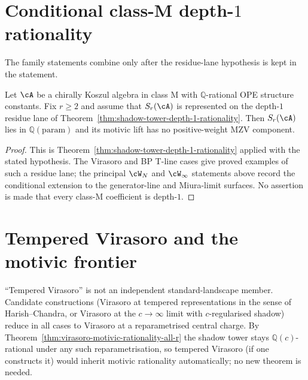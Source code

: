 \section{Conditional class-M depth-$1$ rationality}
\label{sec:class-m-motivic-rationality-full}

The family statements combine only after the residue-lane hypothesis is
kept in the statement.

\begin{theorem}
\ClaimStatusConditional
Let $\cA$ be a chirally Koszul algebra in class M with
$\mathbb{Q}$-rational OPE structure constants. Fix $r \geq 2$ and
assume that $S_r(\cA)$ is represented on the depth-$1$ residue lane of
Theorem~\ref{thm:shadow-tower-depth-1-rationality}. Then
$S_r(\cA)$ lies in $\mathbb{Q}(\mathrm{param})$ and its motivic lift
has no positive-weight MZV component.
\end{theorem}

\begin{proof}
This is Theorem~\ref{thm:shadow-tower-depth-1-rationality} applied
with the stated hypothesis. The Virasoro and BP T-line cases give
proved examples of such a residue lane; the principal $\cW_N$ and
$\cW_\infty$ statements above record the conditional extension to the
generator-line and Miura-limit surfaces. No assertion is made that
every class-M coefficient is depth-$1$.
\end{proof}

\section{Tempered Virasoro and the motivic frontier}
\label{sec:tempered-vir-motivic-frontier}

\begin{remark}
``Tempered Virasoro'' is not an independent standard-landscape
member. Candidate constructions (Virasoro at tempered representations
in the sense of Harish--Chandra, or Virasoro at the $c \to \infty$
limit with $c$-regularised shadow) reduce in all cases to
Virasoro at a reparametrised central charge. By
Theorem~\ref{thm:virasoro-motivic-rationality-all-r} the shadow
tower stays $\mathbb{Q}(c)$-rational under any such
reparametrisation, so tempered Virasoro (if one constructs it) would
inherit motivic rationality automatically; no new theorem is needed.
\end{remark}

